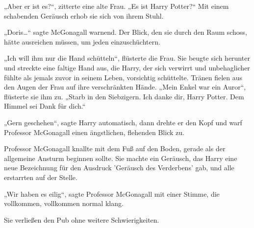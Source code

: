 „Aber er ist es?“, zitterte eine alte Frau. „Es ist Harry Potter?“ Mit einem schabenden Geräusch erhob sie sich von ihrem Stuhl.

„Doris…“ sagte McGonagall warnend. Der Blick, den sie durch den Raum schoss, hätte ausreichen müssen, um jeden einzuschüchtern.

„Ich will ihm nur die Hand schütteln“, flüsterte die Frau. Sie beugte sich herunter und streckte eine faltige Hand aus, die Harry, der sich verwirrt und unbehaglicher fühlte als jemals zuvor in seinem Leben, vorsichtig schüttelte. Tränen fielen aus den Augen der Frau auf ihre verschränkten Hände. „Mein Enkel war ein Auror“, flüsterte sie ihm zu. „Starb in den Siebzigern. Ich danke dir, Harry Potter. Dem Himmel sei Dank für dich.“

„Gern geschehen“, sagte Harry automatisch, dann drehte er den Kopf und warf Professor McGonagall einen ängstlichen, flehenden Blick zu.

Professor McGonagall knallte mit dem Fuß auf den Boden, gerade als der allgemeine Ansturm beginnen sollte. Sie machte ein Geräusch, das Harry eine neue Bezeichnung für den Ausdruck 'Geräusch des Verderbens' gab, und alle erstarrten auf der Stelle.

„Wir haben es eilig“, sagte Professor McGonagall mit einer Stimme, die vollkommen, vollkommen normal klang.

Sie verließen den Pub ohne weitere Schwierigkeiten.

